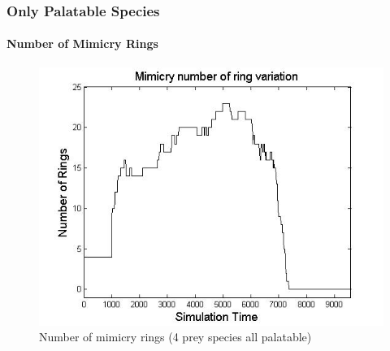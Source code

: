 \frame
{
	\frametitle{Only Palatable Species}
	\framesubtitle{Number of Mimicry Rings}

	\begin{figure}[H]
		\centering
		\includegraphics[scale=0.3]{../tex/images/ringSize10k-4Prey-p}
		\caption{Number of mimicry rings (4 prey species all palatable)}
		\label{fig:ringSize8k-4-Prey-p}
	\end{figure}
}

